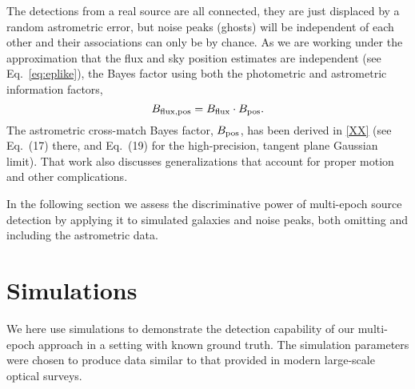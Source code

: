 \documentclass[twocolumn]{emulateapj}
\begin{document}
The detections from a real source are all connected, they are just displaced by a random astrometric error, but noise peaks (ghosts) will be independent of each other and their associations can only be by chance.
As we are working under the approximation that the flux and sky position estimates are independent (see Eq.~\ref{eq:eplike}), the Bayes factor using both the photometric and astrometric information factors,
%
\begin{equation}
B_{\rm{}flux,pos} = B_{\rm{}flux}\cdot{}B_{\rm{}pos}.
\end{equation}
%
The astrometric cross-match Bayes factor, $B_{\rm{}pos}$, has been derived in \ref{XX} (see Eq.~(17) there, and Eq.~(19) for the high-precision, tangent plane Gaussian limit).
That work also discusses generalizations that account for proper motion and other complications.

In the following section we assess the discriminative power of multi-epoch source detection by applying it to simulated galaxies and noise peaks, both omitting and including the astrometric data.





\section{Simulations}
\label{sec:disc}

\noindent
We here use simulations to demonstrate the detection capability of our multi-epoch approach in a setting with known ground truth.
The simulation parameters were chosen to produce data similar to that provided in modern large-scale optical surveys.


\end{document}
